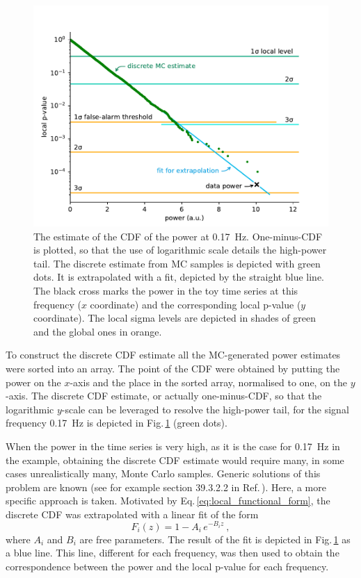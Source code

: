 \begin{figure}
  \centering
  \includegraphics[width=\linewidth]{gfx/axions/MC_estimation_local.pdf}
  \caption{The estimate of the CDF of the power at \SI{0.17}{\hertz}. One-minus-CDF is plotted, so that the use of logarithmic scale details the high-power tail. The discrete estimate from MC samples is depicted with green dots. It is extrapolated with a fit, depicted by the straight blue line. The black cross marks the power in the toy time series at this frequency ($x$ coordinate) and the corresponding local p-value ($y$ coordinate). The local sigma levels are depicted in shades of green and the global ones in orange.}\label{fig:P_best_signal_candidate}
\end{figure}

To construct the discrete CDF estimate all the MC-generated power estimates were sorted into an array. The point of the CDF were obtained by putting the power on the $x$-axis and the place in the sorted array, normalised to one, on the $y$-axis.
The discrete CDF estimate, or actually one-minus-CDF, so that the logarithmic $y$-scale can be leveraged to resolve the high-power tail, for the signal frequency \SI{0.17}{\hertz} is depicted in Fig.\,\ref{fig:P_best_signal_candidate} (green dots).

When the power in the time series is very high, as it is the case for \SI{0.17}{\hertz} in the example, obtaining the discrete CDF estimate would require many, in some cases unrealistically many, Monte Carlo samples. Generic solutions of this problem are known (see for example section 39.3.2.2 in Ref.\,\cite{PDG2016}). Here, a more specific approach is taken. Motivated by Eq.\,\ref{eq:local_functional_form}, the discrete CDF was extrapolated with a linear fit of the form
\begin{equation}
  F_i(z) = 1 - A_i \, e^{-B_i z} \ ,
\end{equation}
where $A_i$ and $B_i$ are free parameters. The result of the fit is depicted in Fig.\,\ref{fig:P_best_signal_candidate} as a blue line. This line, different for each frequency, was then used to obtain the correspondence between the power and the local p-value for each frequency.


